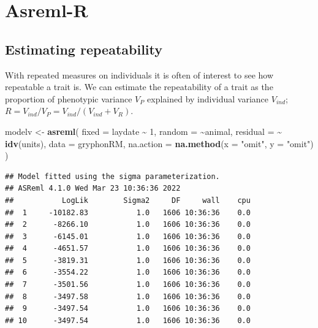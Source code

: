 \documentclass[
  12pt,
]{book}
\newenvironment{Shaded}{\begin{snugshade}}{\end{snugshade}}
\newcommand{\DataTypeTok}[1]{\textcolor[rgb]{0.13,0.29,0.53}{#1}}
\newcommand{\DecValTok}[1]{\textcolor[rgb]{0.00,0.00,0.81}{#1}}
\newcommand{\KeywordTok}[1]{\textcolor[rgb]{0.13,0.29,0.53}{\textbf{#1}}}
\newcommand{\NormalTok}[1]{#1}
\newcommand{\OperatorTok}[1]{\textcolor[rgb]{0.81,0.36,0.00}{\textbf{#1}}}
\newcommand{\StringTok}[1]{\textcolor[rgb]{0.31,0.60,0.02}{#1}}
\begin{document}
\hypertarget{asreml-r-2}{%
\section{Asreml-R}\label{asreml-r-2}}

\hypertarget{estimating-repeatability}{%
\subsection{Estimating repeatability}\label{estimating-repeatability}}

With repeated measures on individuals it is often of interest to see how repeatable a trait is.
We can estimate the repeatability of a trait as the proportion of phenotypic variance \(V_P\) explained by individual variance \(V_{ind}\); \(R = V_{ind}/V_P = V_{ind}/(V_{ind}+V_R)\).

\begin{Shaded}
\begin{Highlighting}[]
\NormalTok{modelv \textless{}{-}}\StringTok{ }\KeywordTok{asreml}\NormalTok{(}
  \DataTypeTok{fixed =}\NormalTok{ laydate }\OperatorTok{\textasciitilde{}}\StringTok{ }\DecValTok{1}\NormalTok{,}
  \DataTypeTok{random =} \OperatorTok{\textasciitilde{}}\NormalTok{animal,}
  \DataTypeTok{residual =} \OperatorTok{\textasciitilde{}}\StringTok{ }\KeywordTok{idv}\NormalTok{(units),}
  \DataTypeTok{data =}\NormalTok{ gryphonRM,}
  \DataTypeTok{na.action =} \KeywordTok{na.method}\NormalTok{(}\DataTypeTok{x =} \StringTok{"omit"}\NormalTok{, }\DataTypeTok{y =} \StringTok{"omit"}\NormalTok{)}
\NormalTok{)}
\end{Highlighting}
\end{Shaded}

\begin{verbatim}
## Model fitted using the sigma parameterization.
## ASReml 4.1.0 Wed Mar 23 10:36:36 2022
##           LogLik        Sigma2     DF     wall    cpu
##  1     -10182.83           1.0   1606 10:36:36    0.0
##  2      -8266.10           1.0   1606 10:36:36    0.0
##  3      -6145.01           1.0   1606 10:36:36    0.0
##  4      -4651.57           1.0   1606 10:36:36    0.0
##  5      -3819.31           1.0   1606 10:36:36    0.0
##  6      -3554.22           1.0   1606 10:36:36    0.0
##  7      -3501.56           1.0   1606 10:36:36    0.0
##  8      -3497.58           1.0   1606 10:36:36    0.0
##  9      -3497.54           1.0   1606 10:36:36    0.0
## 10      -3497.54           1.0   1606 10:36:36    0.0
\end{verbatim}
\end{document}
